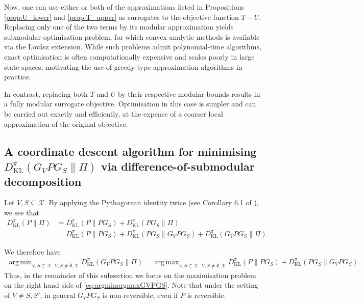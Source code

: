 \documentclass[EJP]{ejpecp} %
\DeclareMathOperator*{\argmin}{arg\,min}
\DeclareMathOperator*{\argmax}{arg\,max}
\begin{document}
Now, one can use either or both of the approximations listed in Propositions \ref{prop:U_lower} and \ref{prop:T_upper} as surrogates to the objective function $T - U.$ Replacing only one of the two terms by its modular approximation yields submodular optimisation problem, for which convex analytic methods is available via the Lovász extension. While such problems admit polynomial-time algorithms, exact optimisation is often computationally expensive and scales poorly in large
state spaces, motivating the use of greedy-type approximation algorithms in practice.

In contrast, replacing both $T$ and $U$ by their respective modular bounds results in a fully modular surrogate objective. Optimisation in this case is simpler and can be carried out exactly and efficiently, at the expense of a coarser local approximation of the original objective. 

\subsection{A coordinate descent algorithm for minimising $D^\pi_{\mathrm{KL}}(G_V P G_S \| \Pi)$ via difference-of-submodular decomposition} \label{sub:doubleMM}

Let $V,S \subseteq \mathcal{X}$. By applying the Pythagorean identity twice (see Corollary 6.1 of \cite{choi2025groupaveragedmarkovchainsmixing}), we see that
\begin{align*}
    D^\pi_{\mathrm{KL}}(P \| \Pi) &= D^\pi_{\mathrm{KL}}(P \| P G_S) + D^\pi_{\mathrm{KL}}(P G_S \| \Pi) \\
                                  &= D^\pi_{\mathrm{KL}}(P \| P G_S) + D^\pi_{\mathrm{KL}}(P G_S \| G_V P G_S) + D^\pi_{\mathrm{KL}}(G_V P G_S \| \Pi).
\end{align*}


We therefore have
\begin{align}\label{eq:argminargmaxGVPGS}
    \argmin_{V,S \subseteq \mathcal{X};~V,S \neq \emptyset, \mathcal{X}} D^\pi_{\mathrm{KL}}(G_V P G_S \| \Pi) = \argmax_{V,S \subseteq \mathcal{X};~V,S \neq \emptyset, \mathcal{X}} D^\pi_{\mathrm{KL}}(P \| P G_S) + D^\pi_{\mathrm{KL}}(P G_S \| G_V P G_S).
\end{align}
Thus, in the remainder of this subsection we focus on the maximisation problem on the right hand side of \eqref{eq:argminargmaxGVPGS}. Note that under the setting of $V \neq S, S'$, in general $G_V P G_S$ is non-reversible, even if $P$ is reversible.
\end{document}
